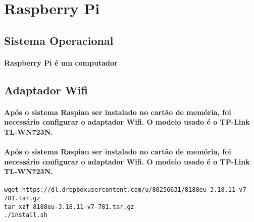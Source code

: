 \label{Cap:implementacao}
\section{Raspberry Pi}
\label{Sec:raspberry}
\subsection{Sistema Operacional}
\paragraph{
	Raspberry Pi é um computador
}
\subsection{Adaptador Wifi}
\paragraph{
	Após o sistema Raspian ser instalado no cartão de memória, foi necessário configurar o adaptador Wifi. O modelo usado é o TP-Link TL-WN723N.
}
\paragraph{
	Após o sistema Raspian ser instalado no cartão de memória, foi necessário configurar o adaptador Wifi. O modelo usado é o TP-Link TL-WN723N.
}
\begin{lstlisting}
wget https://dl.dropboxusercontent.com/u/80256631/8188eu-3.18.11-v7-781.tar.gz
tar xzf 8188eu-3.18.11-v7-781.tar.gz
./install.sh
\end{lstlisting}
